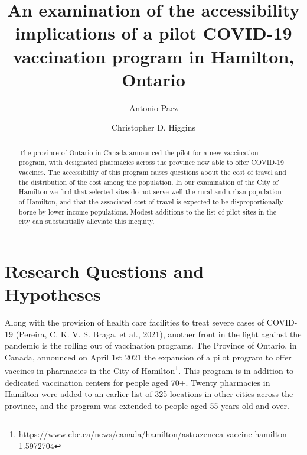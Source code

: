 \documentclass[]{elsarticle} %
\begin{document}
\begin{frontmatter}

  \title{An examination of the accessibility implications of a pilot COVID-19
vaccination program in Hamilton, Ontario}
    \author[McMaster University]{Antonio Paez}
    \author[University of Toronto Scarborough]{Christopher D. Higgins}
      \address[McMaster University]{School of Earth, Environment and Society, McMaster University, Hamilton,
ON, L8S 4K1, Canada}
    \address[University of Toronto Scarborough]{Department of Geography \& Planning, University of Toronto Scarborough,
1265 Military Trail, Toronto, ON M1C1A4}
  
  \begin{abstract}
  The province of Ontario in Canada announced the pilot for a new
  vaccination program, with designated pharmacies across the province now
  able to offer COVID-19 vaccines. The accessibility of this program
  raises questions about the cost of travel and the distribution of the
  cost among the population. In our examination of the City of Hamilton we
  find that selected sites do not serve well the rural and urban
  population of Hamilton, and that the associated cost of travel is
  expected to be disproportionally borne by lower income populations.
  Modest additions to the list of pilot sites in the city can
  substantially alleviate this inequity.
  \end{abstract}
  
 \end{frontmatter}

\hypertarget{research-questions-and-hypotheses}{%
\section{Research Questions and
Hypotheses}\label{research-questions-and-hypotheses}}

Along with the provision of health care facilities to treat severe cases
of COVID-19 (Pereira, C. K. V. S. Braga, et al., 2021), another front in
the fight against the pandemic is the rolling out of vaccination
programs. The Province of Ontario, in Canada, announced on April 1st
2021 the expansion of a pilot program to offer vaccines in pharmacies in
the City of
Hamilton\footnote{\url{https://www.cbc.ca/news/canada/hamilton/astrazeneca-vaccine-hamilton-1.5972704}}.
This program is in addition to dedicated vaccination centers for people
aged 70+. Twenty pharmacies in Hamilton were added to an earlier list of
325 locations in other cities across the province, and the program was
extended to people aged 55 years old and over.
\end{document}
